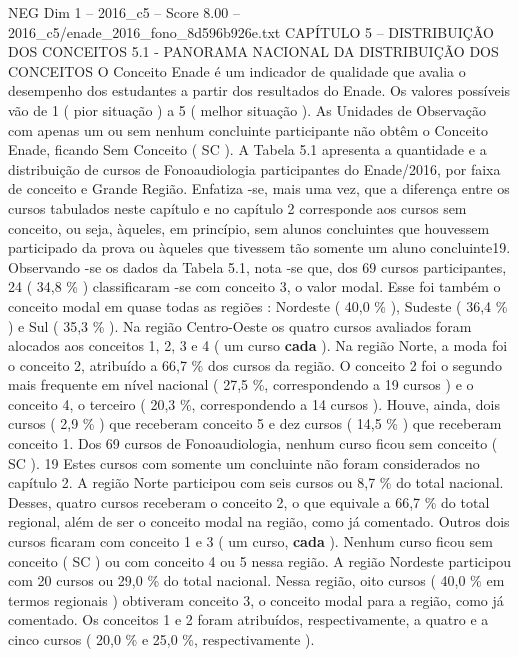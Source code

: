 \begin{textsample}{NEG Dim 1 – 2016\_c5 – Score 8.00 – 2016\_c5/enade\_2016\_fono\_8d596b926e.txt}  \label{ex:f1_neg_365}
CAPÍTULO 5 – DISTRIBUIÇÃO DOS CONCEITOS 5.1 - PANORAMA NACIONAL DA DISTRIBUIÇÃO DOS CONCEITOS O Conceito Enade é um indicador de qualidade que avalia o desempenho dos estudantes a partir dos resultados do Enade.
Os valores possíveis vão de 1 ( pior situação ) a 5 ( melhor situação ).
As Unidades de Observação com apenas um ou sem nenhum concluinte participante não obtêm o Conceito Enade, ficando Sem Conceito ( SC ).
A Tabela 5.1 apresenta a quantidade e a distribuição de cursos de Fonoaudiologia participantes do Enade/2016, por faixa de conceito e Grande Região.
Enfatiza -se, mais uma vez, que a diferença entre os cursos tabulados neste capítulo e no capítulo 2 corresponde aos cursos sem conceito, ou seja, àqueles, em princípio, sem alunos concluintes que houvessem participado da prova ou àqueles que tivessem tão somente um aluno concluinte19.
Observando -se os dados da Tabela 5.1, nota -se que, dos 69 cursos participantes, 24 ( 34,8 \% ) classificaram -se com conceito 3, o valor modal.
Esse foi também o conceito modal em quase todas as regiões : Nordeste ( 40,0 \% ), Sudeste ( 36,4 \% ) e Sul ( 35,3 \% ).
Na região Centro-Oeste os quatro cursos avaliados foram alocados aos conceitos 1, 2, 3 e 4 ( um curso \textbf{cada} ).
Na região Norte, a moda foi o conceito 2, atribuído a 66,7 \% dos cursos da região.
O conceito 2 foi o segundo mais frequente em nível nacional ( 27,5 \%, correspondendo a 19 cursos ) e o conceito 4, o terceiro ( 20,3 \%, correspondendo a 14 cursos ).
Houve, ainda, dois cursos ( 2,9 \% ) que receberam conceito 5 e dez cursos ( 14,5 \% ) que receberam conceito 1.
Dos 69 cursos de Fonoaudiologia, nenhum curso ficou sem conceito ( SC ). 19 Estes cursos com somente um concluinte não foram considerados no capítulo 2.
A região Norte participou com seis cursos ou 8,7 \% do total nacional.
Desses, quatro cursos receberam o conceito 2, o que equivale a 66,7 \% do total regional, além de ser o conceito modal na região, como já comentado.
Outros dois cursos ficaram com conceito 1 e 3 ( um curso, \textbf{cada} ).
Nenhum curso ficou sem conceito ( SC ) ou com conceito 4 ou 5 nessa região.
A região Nordeste participou com 20 cursos ou 29,0 \% do total nacional.
Nessa região, oito cursos ( 40,0 \% em termos regionais ) obtiveram conceito 3, o conceito modal para a região, como já comentado.
Os conceitos 1 e 2 foram atribuídos, respectivamente, a quatro e a cinco cursos ( 20,0 \% e 25,0 \%, respectivamente ).

\end{textsample}
